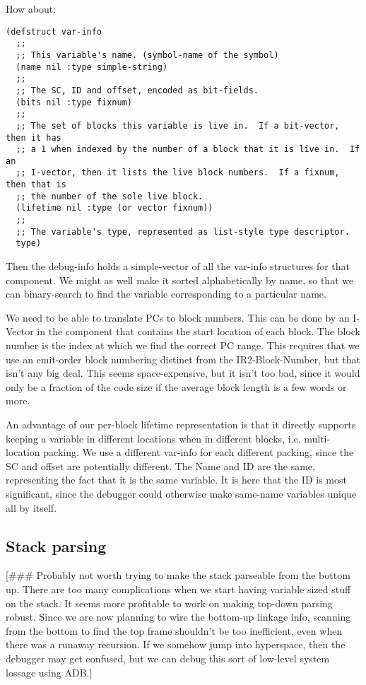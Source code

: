 How about:

\begin{verbatim}
(defstruct var-info
  ;;
  ;; This variable's name. (symbol-name of the symbol)
  (name nil :type simple-string)
  ;;
  ;; The SC, ID and offset, encoded as bit-fields.
  (bits nil :type fixnum)
  ;;
  ;; The set of blocks this variable is live in.  If a bit-vector, then it has
  ;; a 1 when indexed by the number of a block that it is live in.  If an
  ;; I-vector, then it lists the live block numbers.  If a fixnum, then that is
  ;; the number of the sole live block.
  (lifetime nil :type (or vector fixnum))
  ;;
  ;; The variable's type, represented as list-style type descriptor.
  type)
\end{verbatim}

Then the debug-info holds a simple-vector of all the var-info structures for
that component.  We might as well make it sorted alphabetically by name, so
that we can binary-search to find the variable corresponding to a particular
name.

We need to be able to translate PCs to block numbers.  This can be done by an
I-Vector in the component that contains the start location of each block.  The
block number is the index at which we find the correct PC range.  This requires
that we use an emit-order block numbering distinct from the IR2-Block-Number,
but that isn't any big deal.  This seems space-expensive, but it isn't too bad,
since it would only be a fraction of the code size if the average block length
is a few words or more.

An advantage of our per-block lifetime representation is that it directly
supports keeping a variable in different locations when in different blocks,
i.e. multi-location packing.  We use a different var-info for each different
packing, since the SC and offset are potentially different.  The Name and ID
are the same, representing the fact that it is the same variable.  It is here
that the ID is most significant, since the debugger could otherwise make
same-name variables unique all by itself.



\subsection{Stack parsing}

[\#\#\# Probably not worth trying to make the stack parseable from the bottom up.
There are too many complications when we start having variable sized stuff on
the stack.  It seems more profitable to work on making top-down parsing robust.
Since we are now planning to wire the bottom-up linkage info, scanning from the
bottom to find the top frame shouldn't be too inefficient, even when there was
a runaway recursion.  If we somehow jump into hyperspace, then the debugger may
get confused, but we can debug this sort of low-level system lossage using
ADB.]


